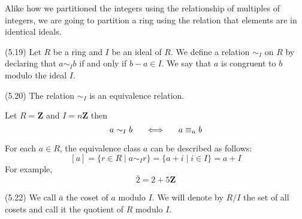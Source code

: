 Alike how we partitioned the integers using the relationship of multiples of integers, we are going to partition a ring using the relation that elements are in identical ideals.
\\
\begin{defi}
(5.19) Let $R$ be a ring and $I$ be an ideal of $R$. We define a relation $\sim_{I}$ on $R$ by declaring that $a\sim_{I}b$ if and only if $b-a\in I$. We say that $a$ is congruent to $b$ modulo the ideal $I$. 
\end{defi}
\vspace{2ex}
\begin{prop}
(5.20) The relation $\sim_{I}$ is an equivalence relation. 
\end{prop}
\vspace{2ex}
\begin{rmk}
Let $R={\bm Z}$ and $I=n{\bm Z}$ then 
\[a\sim_{I}b\hspace{3ex}\iff \hspace{3ex}a \equiv_{n}b\]
\end{rmk}
\vspace{2ex}
\begin{rmk}
For each $a\in R$, the equivalence class $a$ can be described as follows: 
\[[a]=\{r\in R\;|\; a\sim_{I}r\}=\{a+i \;|\; i\in I\}=a+I\]
For example,
\[\bar{2}=2+5{\bm Z}\]
\end{rmk}
\vspace{2ex}
\begin{defi}
(5.22) We call $\bar{a}$ the coset of $a$ modulo $I$. We will denote by $R/I$ the set of all cosets and call it the quotient of $R$ modulo $I$. 
\end{defi}
\vspace{2ex}

